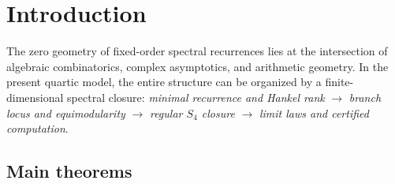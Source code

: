 \section{Introduction}

The zero geometry of fixed-order spectral recurrences lies at the intersection of algebraic combinatorics, complex asymptotics, and arithmetic geometry.
In the present quartic model, the entire structure can be organized by a finite-dimensional spectral closure:
\emph{minimal recurrence and Hankel rank} \(\to\) \emph{branch locus and equimodularity} \(\to\) \emph{regular \(S_4\) closure} \(\to\) \emph{limit laws and certified computation}.

\subsection*{Main theorems}
